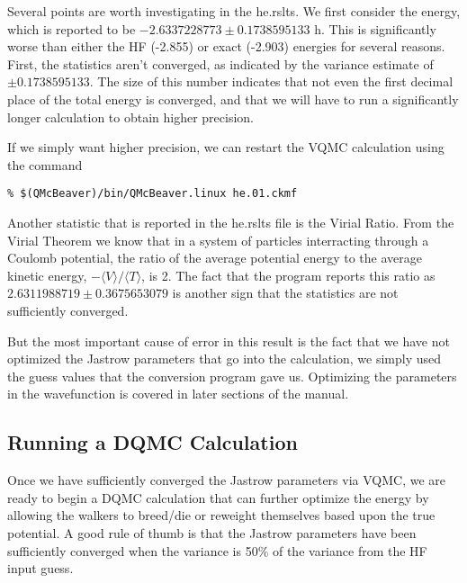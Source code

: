 \documentclass[11pt]{article}
\begin{document}
Several points are worth investigating in the he.rslts. We first
consider the energy, which is reported to be $-2.6337228773 \pm
0.1738595133$ h. This is significantly worse than either the HF
(-2.855) or exact (-2.903) energies for several reasons. First, the
statistics aren't converged, as indicated by the variance estimate of
$\pm 0.1738595133$. The size of this number indicates that not even
the first decimal place of the total energy is converged, and that we
will have to run a significantly longer calculation to obtain higher
precision. 

If we simply want higher precision, we can restart the VQMC
calculation using the command
\begin{verbatim}
% $(QMcBeaver)/bin/QMcBeaver.linux he.01.ckmf
\end{verbatim}

Another statistic that is reported in the he.rslts file is the Virial
Ratio. From the Virial Theorem we know that in a system of particles
interracting through a Coulomb potential, the ratio of the average
potential energy to the average kinetic energy,
$-\langle V\rangle/\langle T \rangle$, is 2. The fact that the program
reports this ratio as $2.6311988719 \pm 0.3675653079$ is another sign
that the statistics are not sufficiently converged.

But the most important cause of error in this result is the fact that
we have not optimized the Jastrow parameters that go into the
calculation, we simply used the guess values that the conversion
program gave us.  Optimizing the parameters in the wavefunction is
covered in later sections of the manual.

\subsection{Running a DQMC Calculation}
Once we have sufficiently converged the Jastrow parameters via VQMC,
we are ready to begin a DQMC calculation that can further optimize the
energy by allowing the walkers to breed/die or reweight themselves
based upon the true potential. A good rule of thumb is that the
Jastrow parameters have been sufficiently converged when the variance
is 50\% of the variance from the HF input guess.


\end{document}
